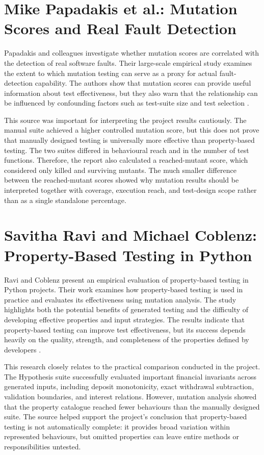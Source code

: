 \documentclass[12pt]{article}
\begin{document}
\section{Mike Papadakis et al.: Mutation Scores and Real Fault Detection}

Papadakis and colleagues investigate whether mutation scores are correlated
with the detection of real software faults. Their large-scale empirical study
examines the extent to which mutation testing can serve as a proxy for actual
fault-detection capability. The authors show that mutation scores can provide
useful information about test effectiveness, but they also warn that the
relationship can be influenced by confounding factors such as test-suite size
and test selection \cite{papadakis2018mutation}.

This source was important for interpreting the project results cautiously. The
manual suite achieved a higher controlled mutation score, but this does not
prove that manually designed testing is universally more effective than
property-based testing. The two suites differed in behavioural reach and in
the number of test functions. Therefore, the report also calculated a
reached-mutant score, which considered only killed and surviving mutants. The
much smaller difference between the reached-mutant scores showed why mutation
results should be interpreted together with coverage, execution reach, and
test-design scope rather than as a single standalone percentage.

\section{Savitha Ravi and Michael Coblenz: Property-Based Testing in Python}

Ravi and Coblenz present an empirical evaluation of property-based testing in
Python projects. Their work examines how property-based testing is used in
practice and evaluates its effectiveness using mutation analysis. The study
highlights both the potential benefits of generated testing and the difficulty
of developing effective properties and input strategies. The results indicate
that property-based testing can improve test effectiveness, but its success
depends heavily on the quality, strength, and completeness of the properties
defined by developers \cite{ravi2025property}.

This research closely relates to the practical comparison conducted in the
project. The Hypothesis suite successfully evaluated important financial
invariants across generated inputs, including deposit monotonicity, exact
withdrawal subtraction, validation boundaries, and interest relations.
However, mutation analysis showed that the property catalogue reached fewer
behaviours than the manually designed suite. The source helped support the
project's conclusion that property-based testing is not automatically complete:
it provides broad variation within represented behaviours, but omitted
properties can leave entire methods or responsibilities untested.
\end{document}
